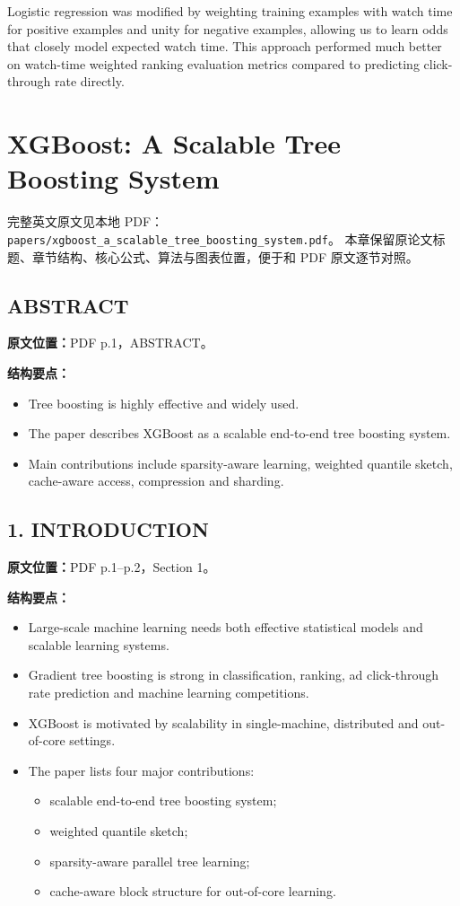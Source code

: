 Logistic regression was modified by weighting training examples with watch
time for positive examples and unity for negative examples, allowing us to
learn odds that closely model expected watch time. This approach performed
much better on watch-time weighted ranking evaluation metrics compared to
predicting click-through rate directly.

\chapter{XGBoost: A Scalable Tree Boosting System}

\begin{note}
完整英文原文见本地 PDF：
\texttt{papers/xgboost\_a\_scalable\_tree\_boosting\_system.pdf}。
本章保留原论文标题、章节结构、核心公式、算法与图表位置，便于和 PDF 原文逐节对照。
\end{note}

\section{ABSTRACT}

\textbf{原文位置：}PDF p.1，ABSTRACT。

\textbf{结构要点：}
\begin{itemize}
  \item Tree boosting is highly effective and widely used.
  \item The paper describes XGBoost as a scalable end-to-end tree boosting system.
  \item Main contributions include sparsity-aware learning, weighted quantile sketch, cache-aware access, compression and sharding.
\end{itemize}

\section{1. INTRODUCTION}

\textbf{原文位置：}PDF p.1--p.2，Section 1。

\textbf{结构要点：}
\begin{itemize}
  \item Large-scale machine learning needs both effective statistical models and scalable learning systems.
  \item Gradient tree boosting is strong in classification, ranking, ad click-through rate prediction and machine learning competitions.
  \item XGBoost is motivated by scalability in single-machine, distributed and out-of-core settings.
  \item The paper lists four major contributions:
  \begin{itemize}
    \item scalable end-to-end tree boosting system;
    \item weighted quantile sketch;
    \item sparsity-aware parallel tree learning;
    \item cache-aware block structure for out-of-core learning.
  \end{itemize}
\end{itemize}

